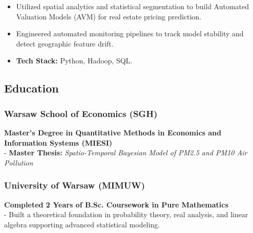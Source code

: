 \documentclass[
  9pt,
  letterpaper,
  DIV=11,
  numbers=noendperiod]{scrartcl}
\providecommand{\tightlist}{%
  \setlength{\itemsep}{0pt}\setlength{\parskip}{0pt}}\usepackage{longtable,booktabs,array}
\begin{document}
\begin{itemize}
\tightlist
\item
  Utilized spatial analytics and statistical segmentation to build
  Automated Valuation Models (AVM) for real estate pricing prediction.
\item
  Engineered automated monitoring pipelines to track model stability and
  detect geographic feature drift.
\item
  \textbf{Tech Stack:} Python, Hadoop, SQL.
\end{itemize}

\hypertarget{education}{%
\subsection{Education}\label{education}}

\hypertarget{warsaw-school-of-economics-sgh}{%
\subsubsection{Warsaw School of Economics
(SGH)}\label{warsaw-school-of-economics-sgh}}

\textbf{Master's Degree in Quantitative Methods in Economics and
Information Systems (MIESI)}\\
- \textbf{Master Thesis:} \emph{Spatio-Temporal Bayesian Model of PM2.5
and PM10 Air Pollution}

\hypertarget{university-of-warsaw-mimuw}{%
\subsubsection{University of Warsaw
(MIMUW)}\label{university-of-warsaw-mimuw}}

\textbf{Completed 2 Years of B.Sc. Coursework in Pure Mathematics}\\
- Built a theoretical foundation in probability theory, real analysis,
and linear algebra supporting advanced statistical modeling.
\end{document}
